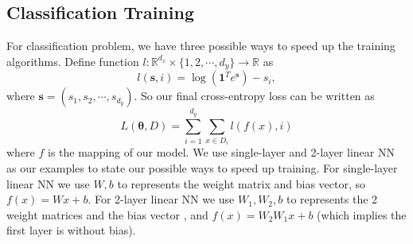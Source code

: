 \subsection{Classification Training}
For classification problem, we have three possible ways to speed up the training algorithms. Define function $l: \mathbb{R}^{d_x}\times \{1,2,\cdots,d_y\} \rightarrow \mathbb{R}$ as
\begin{equation}
	l(\bm s, i) = \log ({\bm 1}^T e^{\bm s}) - s_i,
\end{equation}
where $\bm s = (s_1,s_2,\cdots,s_{d_y})$. So our final cross-entropy loss can be written as
\begin{equation}
	L(\bm\theta,D) = \sum_{i = 1}^{d_y} \sum_{x\in D_i} l(f(x), i) 
\end{equation}
where $f$ is the mapping of our model.  
We use single-layer and 2-layer linear NN as our examples to state our possible ways to speed up training. For single-layer linear NN we use $W,b$ to represents the weight matrix and bias vector, so $f(x) = Wx + b$. For 2-layer linear NN we use $W_1,W_2,b$ to represents the 2 weight matrices and the bias vector , and $f(x) = W_2 W_1 x + b$ (which implies the first layer is without bias).\\

